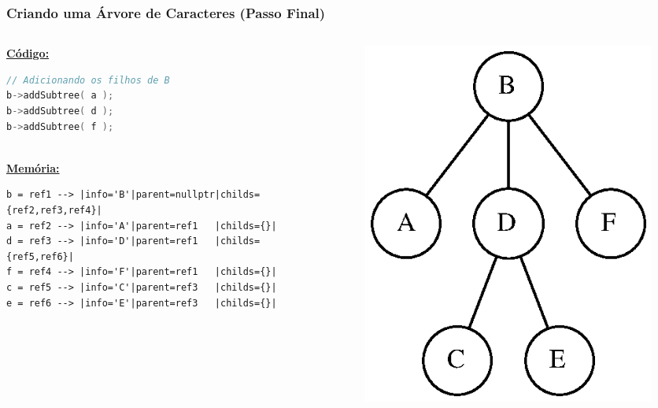 \documentclass[aspectratio=169]{beamer}
\begin{document}
\begin{frame}[fragile]\frametitle{Criando uma Árvore de Caracteres (Passo Final)}
\begin{columns}[T]
\begin{column}{0.5\linewidth}
\textbf{\underline{Código:}}
\begin{lstlisting}[language=C++,basicstyle=\ttfamily\tiny]
// Adicionando os filhos de B
b->addSubtree( a );
b->addSubtree( d );
b->addSubtree( f );
\end{lstlisting}
~\\
\textbf{\underline{Memória:}}
{\tiny
\begin{verbatim}
b = ref1 --> |info='B'|parent=nullptr|childs={ref2,ref3,ref4}|
a = ref2 --> |info='A'|parent=ref1   |childs={}|
d = ref3 --> |info='D'|parent=ref1   |childs={ref5,ref6}|
f = ref4 --> |info='F'|parent=ref1   |childs={}|
c = ref5 --> |info='C'|parent=ref3   |childs={}|
e = ref6 --> |info='E'|parent=ref3   |childs={}|
\end{verbatim}
}
\end{column}
\begin{column}{0.5\linewidth}
\begin{figure}[h]
	\centering
	\includegraphics[height=0.4\paperheight]{imagens/arvore_c.eps}
\end{figure}
\end{column}
\end{columns}
\end{frame}
\end{document}
